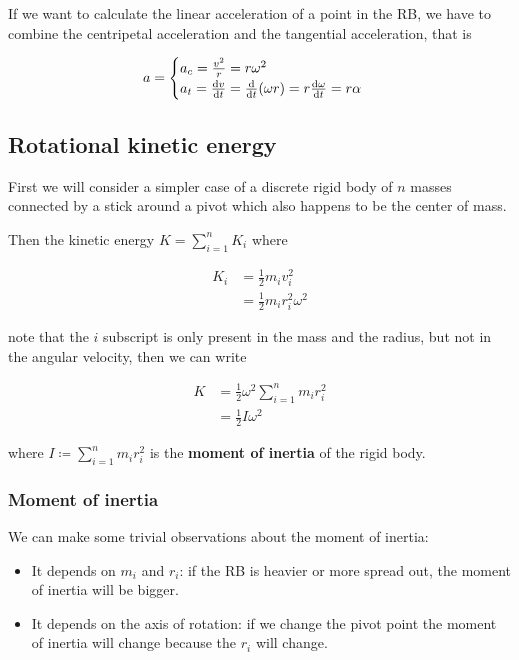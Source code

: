 \documentclass[12pt]{extarticle}
\begin{document}
If we want to calculate the linear acceleration of a point in the RB, we have to combine the centripetal acceleration and the tangential acceleration, that is

$$
    a = \begin{cases}
        a_c = \frac{v^2}{r} = r\omega^2 \\
        a_t = \dv{v}{t} = \dv{t}(\omega r) = r \dv{\omega}{t} = r\alpha
    \end{cases}
$$

\subsection{Rotational kinetic energy}

First we will consider a simpler case of a discrete rigid body of $n$ masses connected by a stick around a pivot which also happens to be the center of mass.

Then the kinetic energy $K = \sum_{i=1}^n K_i$ where

\begin{align}
    K_i & = \frac{1}{2}m_i v_i^2          \\
        & = \frac{1}{2}m_i r_i^2 \omega^2
\end{align}

note that the $i$ subscript is only present in the mass and the radius, but not in the angular velocity, then we can write

\begin{align}
    K & = \frac{1}{2} \omega^2 \sum_{i=1}^n m_i r_i^2 \\
      & = \frac{1}{2} I \omega^2
\end{align}

where $I \coloneq \sum_{i=1}^n m_i r_i^2$ is the \textbf{moment of inertia} of the rigid body.

\subsubsection{Moment of inertia}

We can make some trivial observations about the moment of inertia:

\begin{itemize}
    \item It depends on $m_i$ and $r_i$: if the RB is heavier or more spread out, the moment of inertia will be bigger.
    \item It depends on the axis of rotation: if we change the pivot point the moment of inertia will change because the $r_i$ will change.
\end{itemize}
\end{document}
